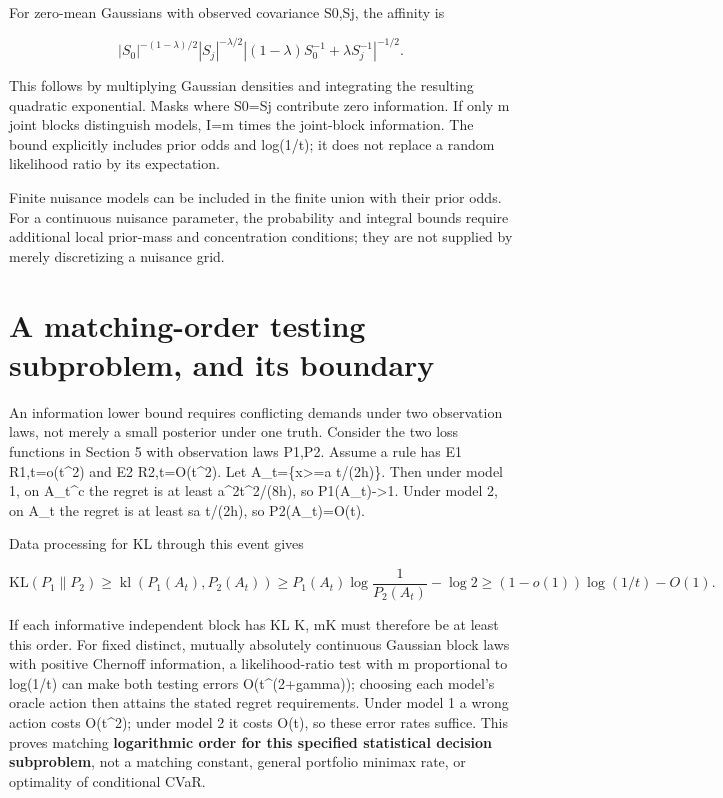 \documentclass[10pt]{article}
\begin{document}
For zero-mean Gaussians with observed covariance S0,Sj, the affinity is

\[
|S_0|^{-(1-\lambda)/2}|S_j|^{-\lambda/2}
|(1-\lambda)S_0^{-1}+\lambda S_j^{-1}|^{-1/2}.
\]



This follows by multiplying Gaussian densities and integrating the resulting quadratic exponential. Masks where S0=Sj contribute zero information. If only m joint blocks distinguish models, I=m times the joint-block information. The bound explicitly includes prior odds and log(1/t); it does not replace a random likelihood ratio by its expectation.

Finite nuisance models can be included in the finite union with their prior odds. For a continuous nuisance parameter, the probability and integral bounds require additional local prior-mass and concentration conditions; they are not supplied by merely discretizing a nuisance grid.

\section{A matching-order testing subproblem, and its boundary}

An information lower bound requires conflicting demands under two observation laws, not merely a small posterior under one truth. Consider the two loss functions in Section 5 with observation laws P1,P2. Assume a rule has E1 R1,t=o(t\textasciicircum{}2) and E2 R2,t=O(t\textasciicircum{}2). Let A\_t=\{x>=a t/(2h)\}. Then under model 1, on A\_t\textasciicircum{}c the regret is at least a\textasciicircum{}2t\textasciicircum{}2/(8h), so P1(A\_t)->1. Under model 2, on A\_t the regret is at least sa t/(2h), so P2(A\_t)=O(t).

Data processing for KL through this event gives

\begin{equation}
\mathrm{KL}(P_1\|P_2)\geq
\operatorname{kl}(P_1(A_t),P_2(A_t))
\geq P_1(A_t)\log\frac1{P_2(A_t)}-\log2
\geq (1-o(1))\log(1/t)-O(1).\tag{10}
\end{equation}



If each informative independent block has KL K, mK must therefore be at least this order. For fixed distinct, mutually absolutely continuous Gaussian block laws with positive Chernoff information, a likelihood-ratio test with m proportional to log(1/t) can make both testing errors O(t\textasciicircum{}(2+gamma)); choosing each model's oracle action then attains the stated regret requirements. Under model 1 a wrong action costs O(t\textasciicircum{}2); under model 2 it costs O(t), so these error rates suffice. This proves matching \textbf{logarithmic order for this specified statistical decision subproblem}, not a matching constant, general portfolio minimax rate, or optimality of conditional CVaR.
\end{document}

